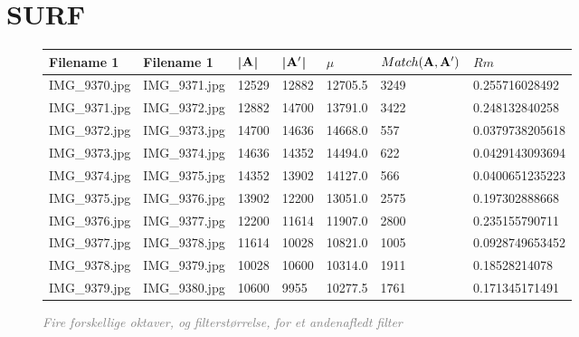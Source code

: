 \section{SURF}
\begin{figure}[H]
    \centering
    \begin{center}    
    \begin{tabular}{ | l | l | l | l | l | l | l |}
    \hline
    Filename 1 & Filename 1 & |$\bold{A}$| & |$\bold{A'}$| & $\mu$ & $Match(\bold{A}, \bold{A}')$ & $Rm$ \\ \hline
IMG\_9370.jpg &	IMG\_9371.jpg &	12529 &	12882 &	12705.5 &	3249 &	0.255716028492\\ \hline
IMG\_9371.jpg &	IMG\_9372.jpg &	12882 &	14700 &	13791.0 &	3422 &	0.248132840258\\ \hline
IMG\_9372.jpg &	IMG\_9373.jpg &	14700 &	14636 &	14668.0 &	557 &	0.0379738205618\\ \hline
IMG\_9373.jpg &	IMG\_9374.jpg &	14636 &	14352 &	14494.0 &	622 &	0.0429143093694\\ \hline
IMG\_9374.jpg &	IMG\_9375.jpg &	14352 &	13902 &	14127.0 &	566 &	0.0400651235223\\ \hline
IMG\_9375.jpg &	IMG\_9376.jpg &	13902 &	12200 &	13051.0 &	2575 &	0.197302888668\\ \hline
IMG\_9376.jpg &	IMG\_9377.jpg &	12200 &	11614 &	11907.0 &	2800 &	0.235155790711\\ \hline
IMG\_9377.jpg &	IMG\_9378.jpg &	11614 &	10028 &	10821.0 &	1005 &	0.0928749653452\\ \hline
IMG\_9378.jpg &	IMG\_9379.jpg &	10028 &	10600 &	10314.0 &	1911 &	0.18528214078\\ \hline
IMG\_9379.jpg &	IMG\_9380.jpg &	10600 &	9955 &	10277.5 &	1761 &	0.171345171491\\ \hline
    \end{tabular}       
    \caption{\textcolor{gray}{\footnotesize \textit{Fire forskellige oktaver, og filterstørrelse, for et andenafledt filter}}}
    \label{tab:OCTAVE3}
     \end{center}
     \vspace{-2.5em}
\end{figure} \noindent

